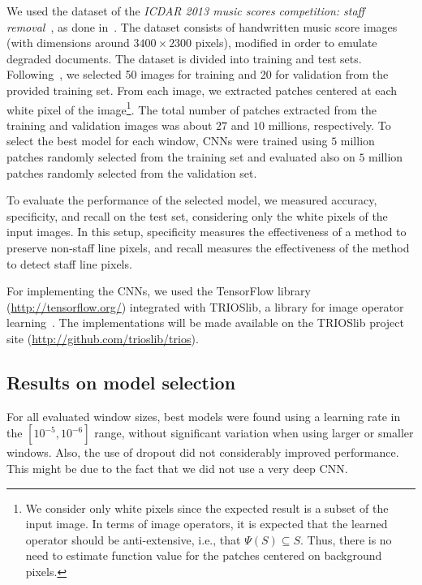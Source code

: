 \documentclass[conference]{IEEEtran}
\begin{document}
We used the dataset of the \emph{ICDAR 2013 music scores
  competition: staff removal}~\cite{CompoICDAR2013}, as done
in~\cite{2017:IgorPR}. The dataset consists of handwritten music score
images (with dimensions around $3400\times 2300$ pixels), modified in
order to emulate degraded documents. The dataset is divided into
training and test sets. Following~\cite{2017:IgorPR}, we selected 50
images for training and 20 for validation from the provided training
set. From each image, we extracted patches centered at each white
pixel of the image\footnote{We consider only white
  pixels since the expected result is a subset of the input image. In
  terms of image operators, it is expected that the learned operator
  should be anti-extensive, i.e., that $\Psi(S) \subseteq S$. Thus,
  there is no need to estimate function value for the patches centered
  on background pixels.}.
The total number of patches extracted from the
training and validation images was about $27$ and $10$ millions,
respectively. To select the best model for each window, CNNs were
trained using $5$ million patches randomly selected from the training
set and evaluated also on $5$ million patches randomly selected from
the validation set.

To evaluate the performance of the selected model, we measured
accuracy, specificity, and recall on the test set, considering only
the white pixels of the input images. In this setup, specificity
measures the effectiveness of a method to preserve non-staff line
pixels, and recall measures the effectiveness of the method to detect
staff line pixels.

For implementing the CNNs, we used the TensorFlow library
(\url{http://tensorflow.org/}) %
integrated with TRIOSlib, a library for image operator
learning~\cite{2016:tutorialSIB}. The implementations will be made
available on the TRIOSlib project site
(\url{http://github.com/trioslib/trios}).


\subsection{Results on model selection}

For all evaluated window sizes, best models were found using a
learning rate in the $[10^{-5}, 10^{-6}]$ range, without significant
variation when using larger or smaller windows. Also, the use of
dropout did not considerably improved performance. This might be due
to the fact that we did not use a very deep CNN.
\end{document}
